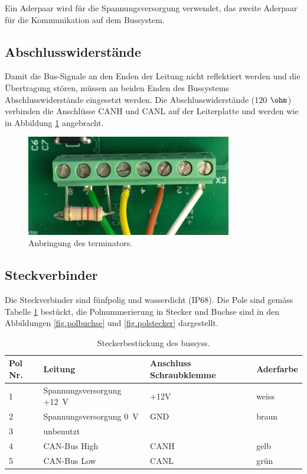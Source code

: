 Ein Aderpaar wird für die Spannungsversorgung verwendet, das zweite Aderpaar für die Kommunikation auf dem Bussystem.

\subsection{Abschlusswiderstände}
Damit die Bus-Signale an den Enden der Leitung nicht reflektiert werden und die Übertragung stören, müssen an beiden Enden des Bussystems Abschlusswiderstände eingesetzt werden.  Die Abschlusswiderstände (120 \ensuremath{\ohm}) verbinden die Anschlüsse CANH und CANL auf der Leiterplatte und werden wie in Abbildung \ref{fig.terminator} angebracht.

\begin{figure}
	\centering
		\includegraphics[width=0.8\textwidth]{images/fotos/terminator.png}
	\caption{Anbringung des \gls{terminator}s.}
	\label{fig.terminator}
\end{figure}

\subsection{Steckverbinder}
Die Steckverbinder sind fünfpolig und wasserdicht (IP68). Die Pole sind gemäss Tabelle \ref{table.stecker} bestückt, die Polnummerierung in Stecker und Buchse sind in den Abbildungen \ref{fig.polbuchse} und \ref{fig.polstecker} dargestellt.

\begin{table}
\begin{tabular}{|l|l|l|l|}
\hline \textbf{Pol Nr.}      & \textbf{Leitung} & Anschluss Schraubklemme & Aderfarbe\\ 
\hline 1 & Spannungsversorgung +12~V & +12V & weiss \\
\hline 2 & Spannungsversorgung 0~V & GND & braun \\
\hline 3 & unbenutzt &  &  \\
\hline 4 & CAN-Bus High & CANH & gelb \\
\hline 5 & CAN-Bus Low & CANL & grün \\
\hline 
\end{tabular}
\caption{Steckerbestückung des \gls{bussys}s.}
\label{table.stecker}
\end{table}  

